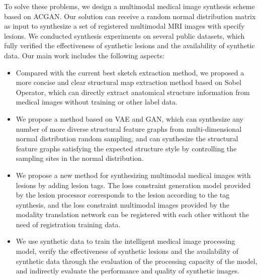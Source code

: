 \documentclass[runningheads]{llncs}
\begin{document}
To solve these problems, we design a multimodal medical image synthesis scheme based on ACGAN\cite{98odena2016conditional}.  Our solution can receive a random normal distribution matrix as input to synthesize a set of registered multimodal MRI images with specify lesions. We conducted synthesis experiments on several public datasets, which fully verified the effectiveness of synthetic lesions and the availability of synthetic data. Our main work includes the following aspects:
\begin{itemize}
	\item Compared with the current best sketch extraction method, we proposed a more concise and clear structural map extraction method based on Sobel Operator\cite{147Sobel}, which can directly extract anatomical structure information from medical images without training or other label data.
	
	\item We propose a method based on VAE and GAN, which can synthesize any number of more diverse structural feature graphs from multi-dimensional normal distribution random sampling, and can synthesize the structural feature graphs satisfying the expected structure style by controlling the sampling sites in the normal distribution.
	
	\item We propose a new method for synthesizing multimodal medical images with lesions by adding lesion tags. The loss constraint generation model provided by the lesion processor corresponds to the lesion according to the tag synthesis, and the loss constraint multimodal images provided by the modality translation network  can be registered with each other without the need of registration training data.
	
	\item We use synthetic data to train the intelligent medical image processing model, verify the effectiveness of synthetic lesions and the availability of synthetic data through the evaluation of the processing capacity of the model, and indirectly evaluate the performance and quality of synthetic images.
\end{itemize}
\end{document}
